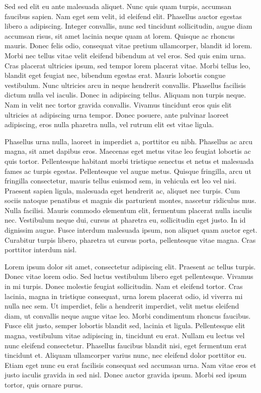 \documentclass[bsc, classic, a4paper]{ufbathesis}
\begin{document}
Sed sed elit eu ante malesuada aliquet. Nunc quis quam turpis, accumsan faucibus sapien. Nam eget sem velit, id eleifend elit. Phasellus auctor egestas libero a adipiscing. Integer convallis, nunc sed tincidunt sollicitudin, augue diam accumsan risus, sit amet lacinia neque quam at lorem. Quisque ac rhoncus mauris. Donec felis odio, consequat vitae pretium ullamcorper, blandit id lorem. Morbi nec tellus vitae velit eleifend bibendum at vel eros. Sed quis enim urna. Cras placerat ultricies ipsum, sed tempor lorem placerat vitae. Morbi tellus leo, blandit eget feugiat nec, bibendum egestas erat. Mauris lobortis congue vestibulum. Nunc ultricies arcu in neque hendrerit convallis. Phasellus facilisis dictum nulla vel iaculis. Donec in adipiscing tellus. Aliquam non turpis neque. Nam in velit nec tortor gravida convallis. Vivamus tincidunt eros quis elit ultricies at adipiscing urna tempor. Donec posuere, ante pulvinar laoreet adipiscing, eros nulla pharetra nulla, vel rutrum elit est vitae ligula.

Phasellus urna nulla, laoreet in imperdiet a, porttitor eu nibh. Phasellus ac arcu magna, sit amet dapibus eros. Maecenas eget metus vitae leo feugiat lobortis ac quis tortor. Pellentesque habitant morbi tristique senectus et netus et malesuada fames ac turpis egestas. Pellentesque vel augue metus. Quisque fringilla, arcu ut fringilla consectetur, mauris tellus euismod sem, in vehicula est leo vel nisi. Praesent sapien ligula, malesuada eget hendrerit ac, aliquet nec turpis. Cum sociis natoque penatibus et magnis dis parturient montes, nascetur ridiculus mus. Nulla facilisi. Mauris commodo elementum elit, fermentum placerat nulla iaculis nec. Vestibulum neque dui, cursus at pharetra eu, sollicitudin eget justo. In id dignissim augue. Fusce interdum malesuada ipsum, non aliquet quam auctor eget. Curabitur turpis libero, pharetra ut cursus porta, pellentesque vitae magna. Cras porttitor interdum nisl.

Lorem ipsum dolor sit amet, consectetur adipiscing elit. Praesent ac tellus turpis. Donec vitae lorem odio. Sed luctus vestibulum libero eget pellentesque. Vivamus in mi turpis. Donec molestie feugiat sollicitudin. Nam et eleifend tortor. Cras lacinia, magna in tristique consequat, urna lorem placerat odio, id viverra mi nulla nec sem. Ut imperdiet, felis a hendrerit imperdiet, velit metus eleifend diam, ut convallis neque augue vitae leo. Morbi condimentum rhoncus faucibus. Fusce elit justo, semper lobortis blandit sed, lacinia et ligula. Pellentesque elit magna, vestibulum vitae adipiscing in, tincidunt eu erat. Nullam eu lectus vel nunc eleifend consectetur. Phasellus faucibus blandit nisi, eget fermentum erat tincidunt et. Aliquam ullamcorper varius nunc, nec eleifend dolor porttitor eu. Etiam eget nunc eu erat facilisis consequat sed accumsan urna. Nam vitae eros et justo iaculis gravida in sed nisl. Donec auctor gravida ipsum. Morbi sed ipsum tortor, quis ornare purus.
\end{document}

